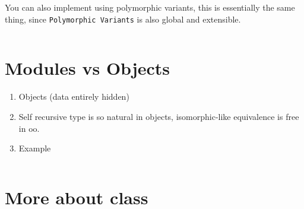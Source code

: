 You can also implement using polymorphic variants, this is essentially
the same thing, since \verb|Polymorphic Variants| is also global and
extensible.


\inputminted[fontsize=\scriptsize, ]{ocaml}{oo/code/downcast2.ml}



\section{Modules vs Objects}

\begin{enumerate}
\item Objects (data entirely hidden)
\item Self recursive type is so natural in objects, isomorphic-like
  equivalence is free in oo.
\item Example

\inputminted[fontsize=\scriptsize, ]{ocaml}{oo/code/obj_module.ml}
\end{enumerate}


\section{More about class}
